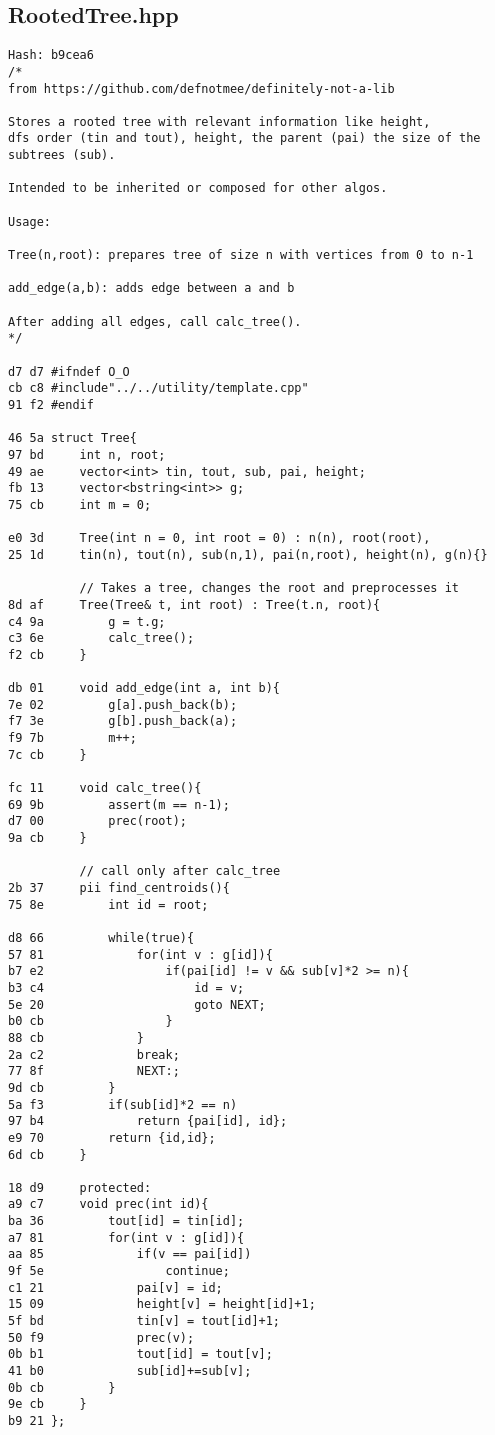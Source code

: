 \documentclass[11pt, a4paper, twoside]{article}
\begin{document}
\subsection{RootedTree.hpp}
\begin{lstlisting}
Hash: b9cea6
/*
from https://github.com/defnotmee/definitely-not-a-lib

Stores a rooted tree with relevant information like height,
dfs order (tin and tout), height, the parent (pai) the size of the 
subtrees (sub). 

Intended to be inherited or composed for other algos.

Usage:

Tree(n,root): prepares tree of size n with vertices from 0 to n-1

add_edge(a,b): adds edge between a and b

After adding all edges, call calc_tree().
*/

d7 d7 #ifndef O_O
cb c8 #include"../../utility/template.cpp"
91 f2 #endif

46 5a struct Tree{
97 bd     int n, root;
49 ae     vector<int> tin, tout, sub, pai, height;
fb 13     vector<bstring<int>> g;
75 cb     int m = 0;
      
e0 3d     Tree(int n = 0, int root = 0) : n(n), root(root), 
25 1d     tin(n), tout(n), sub(n,1), pai(n,root), height(n), g(n){}
      
          // Takes a tree, changes the root and preprocesses it
8d af     Tree(Tree& t, int root) : Tree(t.n, root){
c4 9a         g = t.g;
c3 6e         calc_tree();
f2 cb     }
      
db 01     void add_edge(int a, int b){
7e 02         g[a].push_back(b);
f7 3e         g[b].push_back(a);
f9 7b         m++;
7c cb     }
      
fc 11     void calc_tree(){
69 9b         assert(m == n-1);
d7 00         prec(root);
9a cb     }
      
          // call only after calc_tree
2b 37     pii find_centroids(){
75 8e         int id = root;
      
d8 66         while(true){
57 81             for(int v : g[id]){
b7 e2                 if(pai[id] != v && sub[v]*2 >= n){
b3 c4                     id = v;
5e 20                     goto NEXT;
b0 cb                 }
88 cb             }
2a c2             break;
77 8f             NEXT:;
9d cb         }
5a f3         if(sub[id]*2 == n)
97 b4             return {pai[id], id};
e9 70         return {id,id};
6d cb     }
      
18 d9     protected:
a9 c7     void prec(int id){
ba 36         tout[id] = tin[id];
a7 81         for(int v : g[id]){
aa 85             if(v == pai[id])
9f 5e                 continue;
c1 21             pai[v] = id;
15 09             height[v] = height[id]+1;
5f bd             tin[v] = tout[id]+1;
50 f9             prec(v);
0b b1             tout[id] = tout[v];
41 b0             sub[id]+=sub[v];
0b cb         }
9e cb     }
b9 21 };
\end{lstlisting}
\end{document}

